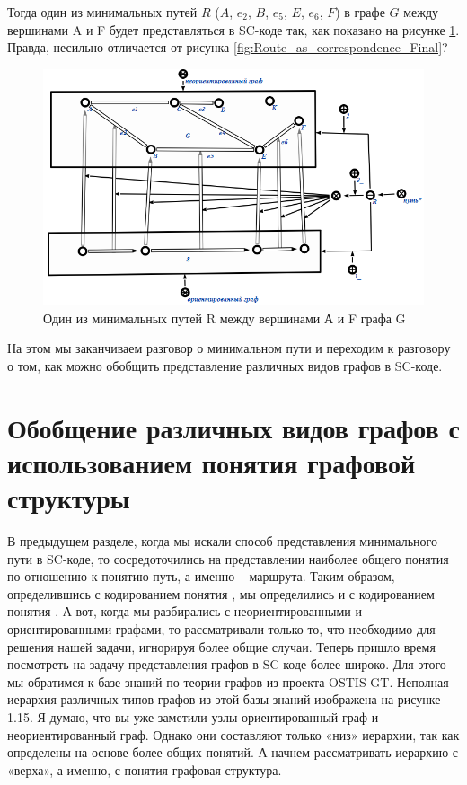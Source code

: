 Тогда один из минимальных путей $R$ ($A$, $e_2$, $B$, $e_5$, $E$,
$e_6$, $F$) в графе $G$ между вершинами A и F будет представляться в
SC-коде так, как показано на рисунке \ref{fig:Path_Final}. Правда,
несильно отличается от рисунка
\ref{fig:Route_as_correspondence_Final}?

\begin{figure}[h!]
  \centering
  \includegraphics[scale=0.6]{images/2/Path_Final}
  \caption{Один из минимальных путей R между вершинами А и F графа G}
  \label{fig:Path_Final}
\end{figure}
 
На этом мы заканчиваем разговор о минимальном пути и переходим к
разговору о том, как можно обобщить представление различных видов
графов в SC-коде.

\section{Обобщение различных видов графов с использованием понятия графовой структуры}

В предыдущем разделе, когда мы искали способ представления
минимального пути в SC-коде, то сосредоточились на представлении
наиболее общего понятия по отношению к понятию путь, а именно –
маршрута. Таким образом, определившись с кодированием понятия
, мы определились и с кодированием понятия . А
вот, когда мы разбирались с неориентированными и ориентированными
графами, то рассматривали только то, что необходимо для решения нашей
задачи, игнорируя более общие случаи. Теперь пришло время посмотреть
на задачу представления графов в SC-коде более широко. Для этого мы
обратимся к базе знаний по теории графов из проекта OSTIS GT. Неполная
иерархия различных типов графов из этой базы знаний изображена на
рисунке 1.15. Я думаю, что вы уже заметили узлы ориентированный граф и
неориентированный граф. Однако они составляют только «низ» иерархии,
так как определены на основе более общих понятий. А начнем
рассматривать иерархию с «верха», а именно, с понятия графовая
структура.

